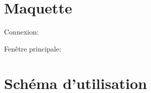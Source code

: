 \documentclass[oneside]{report}
\begin{document}
	\section{Maquette}
	{
		\par Connexion:\\
		\noindent{}
		\par Fenêtre principale:\\
		\noindent{}
	}

	\section{Schéma d'utilisation}
	{
		\noindent{}
	}
\end{document}

